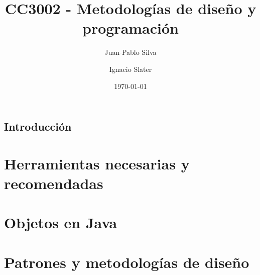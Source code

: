 \documentclass[12pt]{book}
\title{CC3002 - Metodologías de diseño y programación}
\author{Juan-Pablo Silva}
\author{Ignacio Slater}
\affil{Departamento de Ciencias de la Computación, Universidad de Chile}
\date{\today}
\begin{document}
  \frontmatter
  \maketitle
  \tableofcontents
  \chapter{Introducción}

  \mainmatter
  \part{Herramientas necesarias y recomendadas}
    
    
  \part{Objetos en Java}
    
  \part{Patrones y metodologías de diseño}
\end{document}
